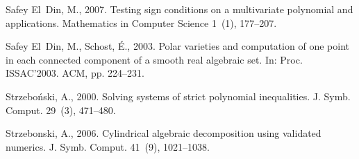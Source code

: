 \documentclass[amsthm]{elsart}
\begin{document}
\begin{thebibliography}{32}
Safey El~Din, M., 2007. Testing sign conditions on a multivariate polynomial
  and applications. Mathematics in Computer Science 1~(1), 177--207.

Safey El~Din, M., Schost, {\'E}., 2003. Polar varieties and computation of one
  point in each connected component of a smooth real algebraic set. In: Proc.
  ISSAC'2003. ACM, pp. 224--231.

Strzebo{\'n}ski, A., 2000. Solving systems of strict polynomial inequalities.
  J. Symb. Comput. 29~(3), 471--480.

Strzebonski, A., 2006. Cylindrical algebraic decomposition using validated
  numerics. J. Symb. Comput. 41~(9), 1021--1038.

\end{thebibliography}
\end{document}
